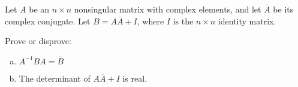 Let $A$ be an $n \times n$ nonsingular matrix with complex elements, and let
$\bar{A}$ be its complex conjugate. Let $B = A\bar{A} + I$, where $I$ is the $n
\times n$ identity matrix.

Prove or disprove:

\begin{enumerate}[(a)]
\item $A^{-1}BA = \bar{B}$
\item The determinant of $A \bar{A} + I$ is real.
\end{enumerate}
